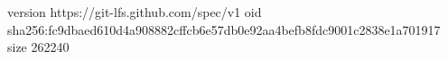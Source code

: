 version https://git-lfs.github.com/spec/v1
oid sha256:fc9dbaed610d4a908882cffcb6e57db0e92aa4befb8fdc9001c2838e1a701917
size 262240

